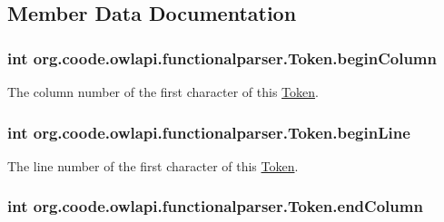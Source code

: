 \subsection{Member Data Documentation}
\hypertarget{classorg_1_1coode_1_1owlapi_1_1functionalparser_1_1_token_a8526bb00292140bd5862edf5f13faa2a}{
\subsubsection[{begin\-Column}]{\setlength{\rightskip}{0pt plus 5cm}int org.\-coode.\-owlapi.\-functionalparser.\-Token.\-begin\-Column}}\label{classorg_1_1coode_1_1owlapi_1_1functionalparser_1_1_token_a8526bb00292140bd5862edf5f13faa2a}
The column number of the first character of this \hyperlink{classorg_1_1coode_1_1owlapi_1_1functionalparser_1_1_token}{Token}. \hypertarget{classorg_1_1coode_1_1owlapi_1_1functionalparser_1_1_token_a0450956c2d1f34109f6c7d4d40bb488f}{
\subsubsection[{begin\-Line}]{\setlength{\rightskip}{0pt plus 5cm}int org.\-coode.\-owlapi.\-functionalparser.\-Token.\-begin\-Line}}\label{classorg_1_1coode_1_1owlapi_1_1functionalparser_1_1_token_a0450956c2d1f34109f6c7d4d40bb488f}
The line number of the first character of this \hyperlink{classorg_1_1coode_1_1owlapi_1_1functionalparser_1_1_token}{Token}. \hypertarget{classorg_1_1coode_1_1owlapi_1_1functionalparser_1_1_token_a3be8b387701e2fcf18d1737e9716536d}{
\subsubsection[{end\-Column}]{\setlength{\rightskip}{0pt plus 5cm}int org.\-coode.\-owlapi.\-functionalparser.\-Token.\-end\-Column}}\label{classorg_1_1coode_1_1owlapi_1_1functionalparser_1_1_token_a3be8b387701e2fcf18d1737e9716536d}
